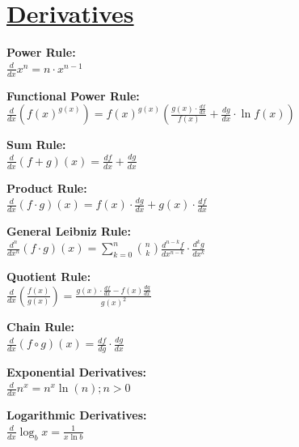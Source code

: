 \documentclass[12pt]{article}
\begin{document}
\section*{\underline{\textbf{Derivatives}}}
\begin{minipage}{\textwidth}
    \textbf{Power Rule:}
    \\ \( \displaystyle\frac{ d }{ dx } x^n = n \cdot x^{n - 1} \)
\end{minipage}
\begin{minipage}{\textwidth}
    \textbf{Functional Power Rule:}
    \\ \( \displaystyle\frac{ d }{ dx } \left( f(x)^{g(x)} \right) = f(x)^{g(x)} \left( \displaystyle\frac{ g(x) \cdot \frac{ df }{ dx } }{ f(x) } + \displaystyle\frac{ dg }{ dx } \cdot \ln{f(x)} \right) \)
\end{minipage}
\begin{minipage}{\textwidth}
    \textbf{Sum Rule:}
    \\ \( \displaystyle\frac{ d }{ dx } (f + g)(x) = \displaystyle\frac{ df }{ dx } + \displaystyle\frac{ dg }{ dx } \)
\end{minipage}
\begin{minipage}{\textwidth}
    \textbf{Product Rule:}
    \\ \( \displaystyle\frac{ d }{ dx } (f \cdot g)(x) = f(x) \cdot \displaystyle\frac{ dg }{ dx } + g(x) \cdot \displaystyle\frac{ df }{ dx } \)
\end{minipage}
\begin{minipage}{\textwidth}
    \textbf{General Leibniz Rule:}
    \\ \( \displaystyle\frac{ d^n }{ dx^n } (f \cdot g)(x) = \displaystyle\sum_{k = 0}^{n} {\binom{n}{k} \displaystyle\frac{ d^{n - k} f }{ dx^{n - k} }} \cdot \displaystyle\frac{ d^k g }{ dx^k } \)
\end{minipage}
\begin{minipage}{\textwidth}
    \textbf{Quotient Rule:}
    \\ \( \displaystyle\frac{ d }{ dx } \left( \displaystyle\frac{ f(x) }{ g(x) } \right) = \displaystyle\frac{ g(x) \cdot \frac{ df }{ dx } - f(x) \frac{ dg }{ dx } }{ g(x)^2 } \)
\end{minipage}
\begin{minipage}{\textwidth}
    \textbf{Chain Rule:}
    \\ \( \displaystyle\frac{ d }{ dx } (f \circ g)(x) = \displaystyle\frac{ df }{ dg } \cdot \displaystyle\frac{ dg }{ dx } \)
\end{minipage}
\begin{minipage}{\textwidth}
    \textbf{Exponential Derivatives:}
    \\ \( \displaystyle\frac{ d }{ dx } n^x = n^x \ln(n) ; n > 0 \)
\end{minipage}
\begin{minipage}{\textwidth}
    \textbf{Logarithmic Derivatives:}
    \\ \( \displaystyle\frac{ d }{ dx } \log_b{x} = \displaystyle\frac{ 1 }{ x \ln b } \)
\end{minipage}
\end{document}
